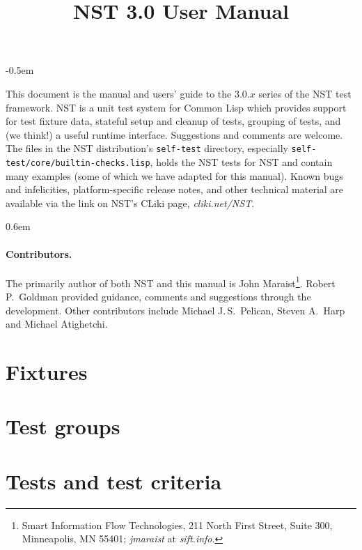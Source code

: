 \documentclass{article}
\title{NST 3.0 User Manual}
\begin{document}
\maketitle
\thispagestyle{empty}
\parskip -0.5em

\noindent This document is the manual and users' guide to the 3.0.$x$
series of the NST test framework.  NST is a unit test system for
Common Lisp which provides support for test fixture data, stateful
setup and cleanup of tests, grouping of tests, and (we think!) a
useful runtime interface.  Suggestions and comments are welcome.  The
files in the NST distribution's \texttt{self-test} directory,
especially \texttt{self-test/core/builtin-checks.lisp}, holds the NST
tests for NST and contain many examples (some of which we have adapted
for this manual).  Known bugs and infelicities, platform-specific
release notes, and other technical material are available via the link
on NST's CLiki page, \textsl{cliki.net/NST}\enspace.

\tableofcontents
\parskip 0.6em
\parindent 0pt

\paragraph{Contributors.}
The primarily author of both NST and this manual is John
Maraist\footnote{Smart Information Flow Technologies, 211 North First
  Street, Suite 300, Minneapolis, MN 55401; \textsl{jmaraist} at
  \textsl{sift.info}.}.  Robert P.\ Goldman provided guidance,
comments and suggestions through the development.  Other contributors
include Michael J.\,S.\ Pelican, Steven A.\ Harp and Michael
Atighetchi.  \cleardoublepage
{}

\section{Fixtures}
\label{fixtures}



\section{Test groups}
\label{sec:groups}


\section{Tests and test criteria}
\label{sec:deftest}

\end{document}
